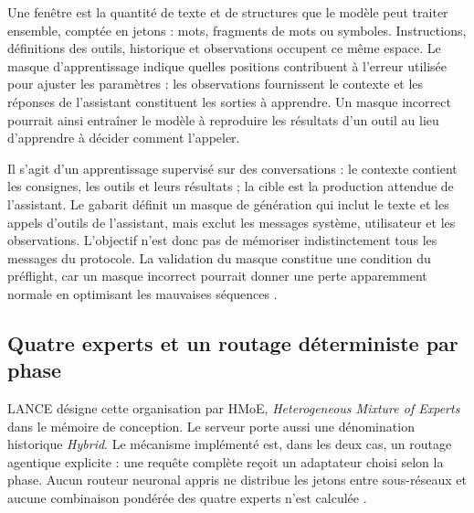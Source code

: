 \documentclass[11pt,a4paper]{article}
\begin{document}
Une fenêtre est la quantité de texte et de structures que le modèle peut
traiter ensemble, comptée en jetons : mots, fragments de mots ou symboles.
Instructions, définitions des outils, historique et observations occupent ce
même espace. Le masque d'apprentissage indique quelles positions contribuent
à l'erreur utilisée pour ajuster les paramètres : les observations fournissent
le contexte et les réponses de l'assistant constituent les sorties à apprendre.
Un masque incorrect pourrait ainsi entraîner le modèle à reproduire les
résultats d'un outil au lieu d'apprendre à décider comment l'appeler.

Il s'agit d'un apprentissage supervisé sur des conversations : le contexte
contient les consignes, les outils et leurs résultats ; la cible est la
production attendue de l'assistant. Le gabarit définit un masque de génération
qui inclut le texte et les appels d'outils de l'assistant, mais exclut les
messages système, utilisateur et les observations. L'objectif n'est donc pas
de mémoriser indistinctement tous les messages du protocole. La validation du
masque constitue une condition du préflight, car un masque incorrect pourrait
donner une perte apparemment normale en optimisant les mauvaises séquences
\cite{ml-template,ml-preflight}.

\subsection{Quatre experts et un routage déterministe par phase}

LANCE désigne cette organisation par HMoE, \emph{Heterogeneous Mixture of
Experts} dans le mémoire de conception. Le serveur porte aussi une dénomination
historique \emph{Hybrid}. Le mécanisme implémenté est, dans les deux cas, un
routage agentique explicite : une requête complète reçoit un adaptateur choisi
selon la phase. Aucun routeur neuronal appris ne distribue les jetons entre
sous-réseaux et aucune combinaison pondérée des quatre experts n'est calculée
\cite{ml-memoire,ml-server}.
\end{document}
